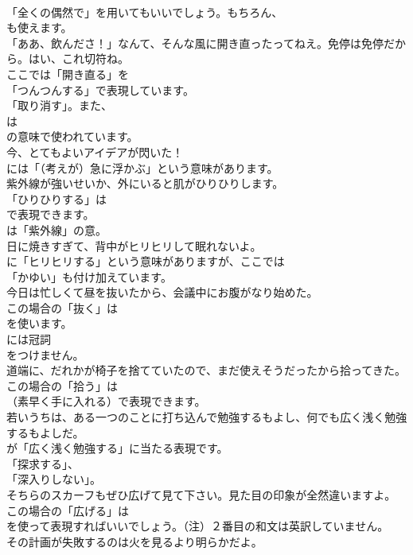 \documentclass[8pt]{extreport}
\begin{document}
\begin{CJK}{UTF8}{min}
\\	「全くの偶然で」を用いてもいいでしょう。もちろん、
\\	も使えます。	
\\	「ああ、飲んださ！」なんて、そんな風に開き直ったってねえ。免停は免停だから。はい、これ切符ね。 
\\	ここでは「開き直る」を
\\	「つんつんする」で表現しています。
\\	「取り消す」。また、
\\	は
\\	の意味で使われています。	
\\	今、とてもよいアイデアが閃いた！ 
\\	には「（考えが）急に浮かぶ」という意味があります。	
\\	紫外線が強いせいか、外にいると肌がひりひりします。 
\\	「ひりひりする」は 
\\	で表現できます。
\\	は「紫外線」の意。	
\\	日に焼きすぎて、背中がヒリヒリして眠れないよ。 
\\	に「ヒリヒリする」という意味がありますが、ここでは
\\	「かゆい」も付け加えています。	
\\	今日は忙しくて昼を抜いたから、会議中にお腹がなり始めた。 
\\	この場合の「抜く」は
\\	を使います。
\\	には冠詞
\\	をつけません。	
\\	道端に、だれかが椅子を捨てていたので、まだ使えそうだったから拾ってきた。 
\\	この場合の「拾う」は 
\\	（素早く手に入れる）で表現できます。	
\\	若いうちは、ある一つのことに打ち込んで勉強するもよし、何でも広く浅く勉強するもよしだ。 
\\	が「広く浅く勉強する」に当たる表現です。
\\	「探求する」、
\\	「深入りしない」。	
\\	そちらのスカーフもぜひ広げて見て下さい。見た目の印象が全然違いますよ。 
\\	この場合の「広げる」は 
\\	を使って表現すればいいでしょう。（注）２番目の和文は英訳していません。	
\\	その計画が失敗するのは火を見るより明らかだよ。 

\end{CJK}
\end{document}
